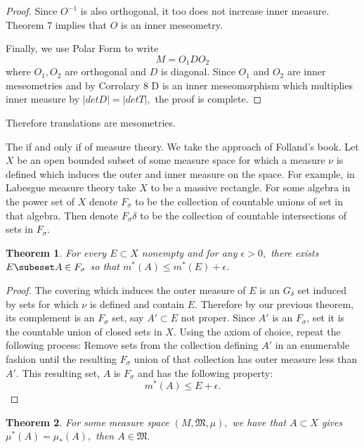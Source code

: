 \documentclass[letter]{article}
\newtheorem{theorem}{Theorem}
\newenvironment{menumerate}{%
  \edef\backupindent{\the\parindent}%
  \enumerate%
  \setlength{\parindent}{\backupindent}%
}{\endenumerate}
\begin{document}
\begin{menumerate}
\begin{proof}
		Since $O^{-1}$ is also orthogonal, it too does not increase inner measure. Theorem $7$ implies that $O$ is an inner meseometry.

		Finally, we use Polar Form to write
		\begin{equation}
			M = O_1 D O_2
		\end{equation}
		where $O_1, O_2$ are orthogonal and $D$ is diagonal. Since $O_1$ and $O_2$ are inner meseometries and by Corrolary $8$ D is an inner meseomorphism which multiplies inner measure by $|det D| =|det T|,$ the proof is complete. 
	\end{proof}
	Therefore translations are mesometries.

	\setcounter{enumi}{8}
	\item The if and only if of measure theory. We take the approach of Folland's book.
		Let $X$ be an open bounded subset of some measure space for which a measure $\nu$ is defined
		which induces the outer and inner measure on the space. For example, in Labesgue measure theory
		take $X$ to be a massive rectangle. For some algebra in the power 
		set of $X$ denote $F_\sigma$ to be the collection of countable unions of set in that algebra.
		Then denote $F_\sigma\delta$ to be the collection of countable intersections of sets in $F_\sigma.$
	\begin{theorem}
		For every $E \subset X$ nonempty and for any $\epsilon > 0,$ there exists $E\subeset A \in F_\sigma$ so
		that $m^*(A) \leq m^*(E) + \epsilon.$
	\end{theorem}
	\begin{proof}
		The covering which induces the outer measure of $E$ is an $G_\delta$ set induced by sets
		for which $\nu$ is defined and contain $E.$ Therefore by our previous theorem, its complement
		is an $F_\sigma$ set, say $A' \subset E$ not proper. Since $A'$ is an $F_\sigma$, set it is 
		the countable union of closed sets in $X$. Using the axiom of choice, repeat the following process:
		Remove sets from the collection defining $A'$ in an enumerable fashion until the resulting
		$F_\sigma$ union of that collection has outer measure less than $A'.$ This resulting set, 
		$A$ is $F_\sigma$ and has the following property:
		\begin{equation}
			m^*(A) \leq E + \epsilon.	
		\end{equation}
	\end{proof}
	\begin{theorem}
		For some measure space $(M, \mathfrak{M}, \mu),$ we have that $A \subset X$ gives $\mu^*(A) = \mu_*(A),$ then $A \in \mathfrak{M}.$

\end{theorem}
\end{menumerate}
\end{document}
